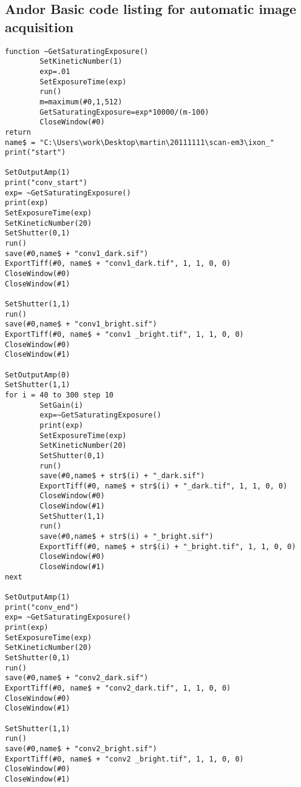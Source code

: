 \subsection{Andor Basic code listing for automatic image acquisition}
{\small
\begin{verbatim}
function ~GetSaturatingExposure()
        SetKineticNumber(1)
        exp=.01
        SetExposureTime(exp)
        run()
        m=maximum(#0,1,512)
        GetSaturatingExposure=exp*10000/(m-100)
        CloseWindow(#0)
return
name$ = "C:\Users\work\Desktop\martin\20111111\scan-em3\ixon_"
print("start")

SetOutputAmp(1)
print("conv_start")
exp= ~GetSaturatingExposure()
print(exp)
SetExposureTime(exp)
SetKineticNumber(20)
SetShutter(0,1)
run()
save(#0,name$ + "conv1_dark.sif")
ExportTiff(#0, name$ + "conv1_dark.tif", 1, 1, 0, 0)
CloseWindow(#0)
CloseWindow(#1)
        
SetShutter(1,1)
run()
save(#0,name$ + "conv1_bright.sif")
ExportTiff(#0, name$ + "conv1 _bright.tif", 1, 1, 0, 0)
CloseWindow(#0)
CloseWindow(#1)

SetOutputAmp(0)
SetShutter(1,1)
for i = 40 to 300 step 10
        SetGain(i)
        exp=~GetSaturatingExposure()
        print(exp)
        SetExposureTime(exp)
        SetKineticNumber(20)
        SetShutter(0,1)
        run()
        save(#0,name$ + str$(i) + "_dark.sif")
        ExportTiff(#0, name$ + str$(i) + "_dark.tif", 1, 1, 0, 0)
        CloseWindow(#0)
        CloseWindow(#1)
        SetShutter(1,1)
        run()
        save(#0,name$ + str$(i) + "_bright.sif")
        ExportTiff(#0, name$ + str$(i) + "_bright.tif", 1, 1, 0, 0)
        CloseWindow(#0)
        CloseWindow(#1)
next

SetOutputAmp(1)
print("conv_end")
exp= ~GetSaturatingExposure()
print(exp)
SetExposureTime(exp)
SetKineticNumber(20)
SetShutter(0,1)
run()
save(#0,name$ + "conv2_dark.sif")
ExportTiff(#0, name$ + "conv2_dark.tif", 1, 1, 0, 0)
CloseWindow(#0)
CloseWindow(#1)
        
SetShutter(1,1)
run()
save(#0,name$ + "conv2_bright.sif")
ExportTiff(#0, name$ + "conv2 _bright.tif", 1, 1, 0, 0)
CloseWindow(#0)
CloseWindow(#1)
\end{verbatim}
}

